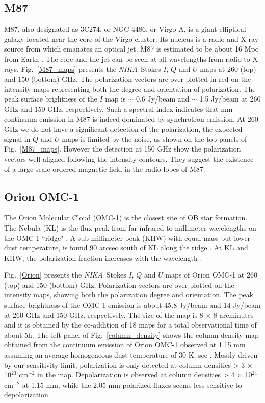 \documentclass[twocolumn, traditabstract]{aa}
\newcommand{\nika}{{\it NIKA}}
\begin{document}
\subsection{M87}
 M87, also designated as 3C274, or NGC 4486, or Virgo A, is a giant elliptical
 galaxy \citep{dev76} located near the core of the Virgo cluster.  Its nucleus is
 a radio and X-ray source from which emanates an optical jet.  M87 is
 estimated to be about 16 Mpc from Earth \citep{mou80}. The core and
 the jet can be seen at all wavelengths from radio to X-rays.
  Fig.~\ref{M87_maps} presents the \nika\ Stokes $I$, $Q$ and
 $U$ maps at 260 (top) and 150 (bottom) GHz. The polarization vectors are
 over-plotted in red on the intensity maps representing both the degree and
 orientation of polarization. The peak surface brightness of the $I$ map is $\sim$ 0.6 Jy/beam
and $\sim$ 1.5 Jy/beam at 260 GHz and 150 GHz, respectively. 
Such a spectral index indicates that mm continuum emission in M87 is indeed dominated by synchrotron emission.
 At 260 GHz we do not have a significant detection of the polarization, the expected signal in $Q$ and $U$ maps is limited by the noise, as shown on the
 top panels of Fig.~\ref{M87_maps}.
 However the detection at 150 GHz show the polarization vectors 
 well aligned following the intensity contours. They suggest the
 existence of a large scale ordered magnetic field in the radio lobes of M87.
  
\subsection{Orion OMC-1}
The Orion Molecular Cloud (OMC-1) is the closest site of OB star formation. The
Nebula (KL) is the flux peak from far infrared to millimeter wavelengths on the
OMC-1 ``ridge" \citep{schle1998}.  A sub-millimeter peak (KHW) with equal mass
but lower dust temperature, is found 90 arcsec south of KL along the ridge
\citep{KHW1982}. At KL and KHW, the polarization fraction increases with the
wavelength \citep{schle1998}.

Fig.~\ref{Orion} presents the \nika\ Stokes $I$, $Q$ and $U$ maps of Orion OMC-1 at 260 (top) and 150
(bottom) GHz.  Polarization vectors are over-plotted on the intensity maps,
showing both the polarization degree and orientation.
 The peak surface brightness of the OMC-1
emission is about 45.8 Jy/beam and 14 Jy/beam at 260 GHz and 150 GHz,
respectively. The size of the map is 8 $\times$ 8 arcminutes and it is obtained by the
co-addition of 18 maps for a total observational time of about 5h. 
The left panel of Fig.~\ref{column_density} shows the column density map obtained from the continuum emission of Orion OMC-1 observed at 1.15 mm assuming an
average homogeneous dust temperature of 30 K, see \citep{2014A&A...566A..45L}. Mostly driven by our sensitivity limit, polarization is only detected at column densities > 3 $\times$ 10$^{23}$ cm$^{-2}$ in the map.
Depolarization is observed at column densities > 4 $\times$ 10$^{24}$ cm$^{-2}$ at 1.15 mm, while the 2.05 mm polarized fluxes seems less sensitive to depolarization. 
\end{document}
